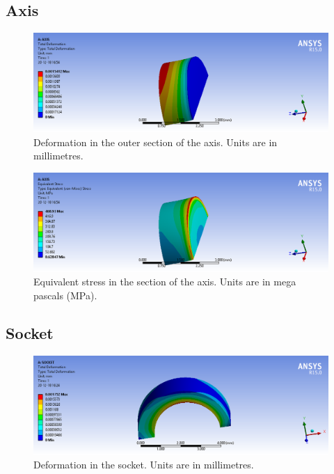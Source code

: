 \documentclass[a4paper 12pt]{article}
\begin{document}
\newpage
\subsection{Axis}

\begin{figure}[!ht]
    \centering
    \includegraphics[width=1\textwidth]{images/AXIS_DISPLACEMENT.png}
    \caption{Deformation in the outer section of the axis. Units are in millimetres.}
    \label{fig:axis_deformation}
\end{figure}

\begin{figure}[!ht]
    \centering
    \includegraphics[width=1\textwidth]{images/AXIS_STRESS.png}
    \caption{Equivalent stress in the section of the axis. Units are in mega pascals (MPa).}
    \label{fig:axis_stress}
\end{figure}
\newpage
\subsection{Socket}

\begin{figure}[!ht]
    \centering
    \includegraphics[width=1\textwidth]{images/SOCKET_DEFORMATION.png}
    \caption{Deformation in the socket. Units are in millimetres.}
    \label{fig:socket_deformation}
\end{figure}
\end{document}
